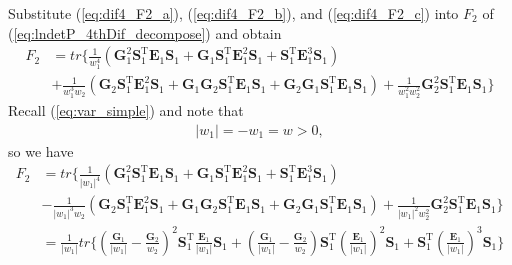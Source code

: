 \documentclass[12pt]{article}
\begin{document}
Substitute (\ref{eq:dif4_F2_a}), (\ref{eq:dif4_F2_b}), and (\ref{eq:dif4_F2_c}) into $F_2$ of (\ref{eq:lndetP_4thDif_decompose}) and obtain
\begin{align*}
F_2 &= tr\{ \frac{1}{w_1^4} ( \mathbf{G}_1^2 \mathbf{S}_1^{\mathrm{T}} \mathbf{E}_1 \mathbf{S}_1 + \mathbf{G}_1 \mathbf{S}_1^{\mathrm{T}} \mathbf{E}_1^2 \mathbf{S}_1 + \mathbf{S}_1^{\mathrm{T}} \mathbf{E}_1^3 \mathbf{S}_1 )  \\
    & + \frac{1}{w_1^3 w_2} ( \mathbf{G}_2 \mathbf{S}_1^{\mathrm{T}} \mathbf{E}_1^2 \mathbf{S}_1 + \mathbf{G}_1 \mathbf{G}_2 \mathbf{S}_1^{\mathrm{T}} \mathbf{E}_1 \mathbf{S}_1 + \mathbf{G}_2 \mathbf{G}_1 \mathbf{S}_1^{\mathrm{T}} \mathbf{E}_1 \mathbf{S}_1 ) + \frac{1}{w_1^2 w_2^2} \mathbf{G}_2^2 \mathbf{S}_1^{\mathrm{T}} \mathbf{E}_1 \mathbf{S}_1  \}
\end{align*}
Recall (\ref{eq:var_simple}) and note that
\begin{align*}
| w_1 | = - w_1 = w > 0, 
\end{align*}
so we have
\begin{align}  \label{eq:dif4_F2_new}
F_2 &= tr\{ \frac{1}{| w_1 |^4} ( \mathbf{G}_1^2 \mathbf{S}_1^{\mathrm{T}} \mathbf{E}_1 \mathbf{S}_1 + \mathbf{G}_1 \mathbf{S}_1^{\mathrm{T}} \mathbf{E}_1^2 \mathbf{S}_1 + \mathbf{S}_1^{\mathrm{T}} \mathbf{E}_1^3 \mathbf{S}_1 )  \nonumber \\
    & - \frac{1}{| w_1 |^3 w_2} ( \mathbf{G}_2 \mathbf{S}_1^{\mathrm{T}} \mathbf{E}_1^2 \mathbf{S}_1 + \mathbf{G}_1 \mathbf{G}_2 \mathbf{S}_1^{\mathrm{T}} \mathbf{E}_1 \mathbf{S}_1 + \mathbf{G}_2 \mathbf{G}_1 \mathbf{S}_1^{\mathrm{T}} \mathbf{E}_1 \mathbf{S}_1 ) + \frac{1}{| w_1 |^2 w_2^2} \mathbf{G}_2^2 \mathbf{S}_1^{\mathrm{T}} \mathbf{E}_1 \mathbf{S}_1  \}  \nonumber \\
    &= \frac{1}{| w_1 |} tr\{ (\frac{\mathbf{G}_1}{| w_1 |} - \frac{\mathbf{G}_2}{w_2})^2 \mathbf{S}_1^{\mathrm{T}} \frac{\mathbf{E}_1}{| w_1 |} \mathbf{S}_1  +  (\frac{\mathbf{G}_1}{| w_1 |} - \frac{\mathbf{G}_2}{w_2}) \mathbf{S}_1^{\mathrm{T}} (\frac{\mathbf{E}_1}{| w_1 |})^2 \mathbf{S}_1  +  \mathbf{S}_1^{\mathrm{T}} (\frac{\mathbf{E}_1}{| w_1 |})^3 \mathbf{S}_1  \}
\end{align}
\end{document}
